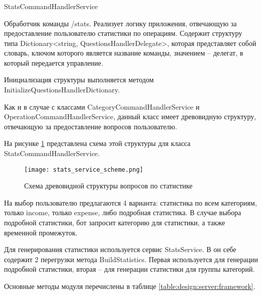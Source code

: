\subsubsection{} StatsCommandHandlerService
\label{sec:design:server:StatsCommandHandlerService}

Обработчик команды /stats. Реализует логику приложения, отвечающую за предоставление пользователю статистики по операциям. Содержит структуру типа Dictionary<string, QuestionsHandlerDelegate>, которая представляет собой словарь, ключом которого является название команды, значением – делегат, в который передается управление.

Инициализация структуры выполняется методом \linebreak InitializeQuestionsHandlerDictionary.

Как и в случае с классами CategoryCommandHandlerService и \linebreak OperationCommandHandlerService, данный класс имеет древовидную структуру, отвечающую за предоставление вопросов пользователю.

На рисунке \ref{fig:design:server:stats_service_scheme} представлена схема этой структуры для класса \linebreak StatsCommandHandlerService.

\begin{figure}[!h]
\centering
	\texttt{[image: stats\_service\_scheme.png]}
	\caption{Схема древовидной структуры вопросов по статистике}
	\label{fig:design:server:stats_service_scheme}
\end{figure}

На выбор пользователю предлагаются 4 варианта: статистика по всем категориям, только income, только expense, либо подробная статистика. В случае выбора подробной статистики, бот запросит категорию для статистики, а также временной промежуток.

Для генерирования статистики используется сервис StatsService. В он себе содержит 2 перегрузки метода BuildStatistics. Первая используется для генерации подробной статистики, вторая – для
генерации статистики для группы категорий.

Основные методы модуля перечислены в таблице \ref{table:design:server:framework}.

\vskip 0.7in

